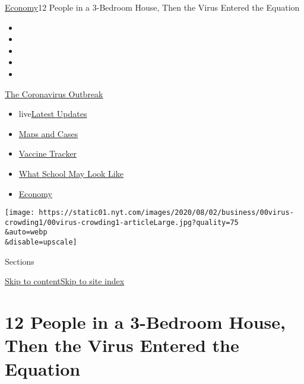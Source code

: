 \href{/section/business/economy}{Economy}\textbar{}12 People in a
3-Bedroom House, Then the Virus Entered the Equation

\begin{itemize}
\item
\item
\item
\item
\item
\end{itemize}

\href{https://www.nytimes.com/news-event/coronavirus?action=click\&pgtype=Article\&state=default\&region=TOP_BANNER\&context=storylines_menu}{The
Coronavirus Outbreak}

\begin{itemize}
\tightlist
\item
  live\href{https://www.nytimes.com/2020/08/01/world/coronavirus-covid-19.html?action=click\&pgtype=Article\&state=default\&region=TOP_BANNER\&context=storylines_menu}{Latest
  Updates}
\item
  \href{https://www.nytimes.com/interactive/2020/us/coronavirus-us-cases.html?action=click\&pgtype=Article\&state=default\&region=TOP_BANNER\&context=storylines_menu}{Maps
  and Cases}
\item
  \href{https://www.nytimes.com/interactive/2020/science/coronavirus-vaccine-tracker.html?action=click\&pgtype=Article\&state=default\&region=TOP_BANNER\&context=storylines_menu}{Vaccine
  Tracker}
\item
  \href{https://www.nytimes.com/interactive/2020/07/29/us/schools-reopening-coronavirus.html?action=click\&pgtype=Article\&state=default\&region=TOP_BANNER\&context=storylines_menu}{What
  School May Look Like}
\item
  \href{https://www.nytimes.com/live/2020/07/31/business/stock-market-today-coronavirus?action=click\&pgtype=Article\&state=default\&region=TOP_BANNER\&context=storylines_menu}{Economy}
\end{itemize}

\texttt{[image: https://static01.nyt.com/images/2020/08/02/business/00virus-crowding1/00virus-crowding1-articleLarge.jpg?quality=75\\\&auto=webp\\\&disable=upscale]}

Sections

\protect\hyperlink{site-content}{Skip to
content}\protect\hyperlink{site-index}{Skip to site index}

\hypertarget{12-people-in-a-3-bedroom-house-then-the-virus-entered-the-equation}{%
\section{12 People in a 3-Bedroom House, Then the Virus Entered the
Equation}\label{12-people-in-a-3-bedroom-house-then-the-virus-entered-the-equation}}

